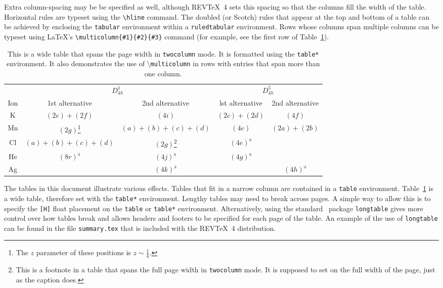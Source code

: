 \documentclass[%
 aip,
 amsmath,amssymb,
reprint, onecolumn %
]{revtex4-1}
\begin{document}
Extra column-spacing may be be specified as well, although
REV\TeX~4 sets this spacing so that the columns fill the width of the
table.
Horizontal rules are typeset using the \verb+\hline+
command.
The doubled (or Scotch) rules that appear at the top and
bottom of a table can be achieved by enclosing the \texttt{tabular}
environment within a \texttt{ruledtabular} environment.
Rows whose columns span multiple columns can be typeset using \LaTeX's
\verb+\multicolumn{#1}{#2}{#3}+ command
(for example, see the first row of Table~\ref{tab:table3}).%
\begin{table}
\caption{\label{tab:table3}This is a wide table that spans the page
width in \texttt{twocolumn} mode. It is formatted using the
\texttt{table*} environment. It also demonstrates the use of
\textbackslash\texttt{multicolumn} in rows with entries that span
more than one column.}
\begin{ruledtabular}
\begin{tabular}{ccccc}
 &\multicolumn{2}{c}{$D_{4h}^1$}&\multicolumn{2}{c}{$D_{4h}^5$}\\
 Ion&1st alternative&2nd alternative&lst alternative
&2nd alternative\\ \hline
 K&$(2e)+(2f)$&$(4i)$ &$(2c)+(2d)$&$(4f)$ \\
 Mn&$(2g)$\footnote{The $z$ parameter of these positions is $z\sim\frac{1}{4}$.}
 &$(a)+(b)+(c)+(d)$&$(4e)$&$(2a)+(2b)$\\
 Cl&$(a)+(b)+(c)+(d)$&$(2g)$\footnote{This is a footnote in a table that spans the full page
width in \texttt{twocolumn} mode. It is supposed to set on the full width of the page, just as the caption does. }
 &$(4e)^{\text{a}}$\\
 He&$(8r)^{\text{a}}$&$(4j)^{\text{a}}$&$(4g)^{\text{a}}$\\
 Ag& &$(4k)^{\text{a}}$& &$(4h)^{\text{a}}$\\
\end{tabular}
\end{ruledtabular}
\end{table}

The tables in this document illustrate various effects.
Tables that fit in a narrow column are contained in a \texttt{table}
environment.
Table~\ref{tab:table3} is a wide table, therefore set with the
\texttt{table*} environment.
Lengthy tables may need to break across pages.
A simple way to allow this is to specify
the \verb+[H]+ float placement on the \texttt{table} or
\texttt{table*} environment.
Alternatively, using the standard \LaTeXe\ package \texttt{longtable} 
gives more control over how tables break and allows headers and footers 
to be specified for each page of the table.
An example of the use of \texttt{longtable} can be found
in the file \texttt{summary.tex} that is included with the REV\TeX~4
distribution.
\end{document}
